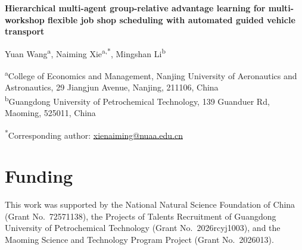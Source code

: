\documentclass[11pt]{article}
\begin{document}
\begin{center}
{\LARGE\bfseries Hierarchical multi-agent group-relative advantage learning for
multi-workshop flexible job shop scheduling with automated guided vehicle
transport\par}
\vspace{1.6em}

{\large Yuan Wang\textsuperscript{a}, Naiming Xie\textsuperscript{a,*},
Mingshan Li\textsuperscript{b}\par}
\vspace{0.8em}

{\normalsize
\textsuperscript{a}College of Economics and Management, Nanjing University of
Aeronautics and Astronautics, 29 Jiangjun Avenue, Nanjing, 211106, China\\
\textsuperscript{b}Guangdong University of Petrochemical Technology,
139 Guanduer Rd, Maoming, 525011, China\par}
\vspace{0.8em}

{\normalsize \textsuperscript{*}Corresponding author:
\href{mailto:xienaiming@nuaa.edu.cn}{xienaiming@nuaa.edu.cn}\par}
\end{center}

\vspace{1.5em}
\section*{Funding}
This work was supported by the National Natural Science Foundation of China
(Grant No.~72571138), the Projects of Talents Recruitment of Guangdong
University of Petrochemical Technology (Grant No.~2026rcyj1003), and the
Maoming Science and Technology Program Project (Grant No.~2026013).
\end{document}
